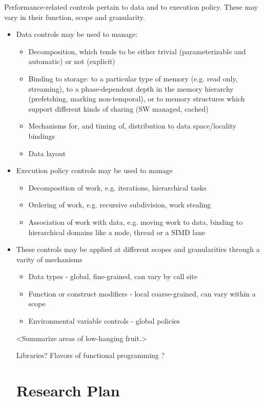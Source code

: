 Performance-related controls pertain to data and to execution policy.  These may vary in their function, scope and granularity.
    \begin{itemize}
    \item Data controls may be used to manage:
      \begin{itemize} 
      \item Decomposition, which tends to be either trivial (parameterizable and automatic) or not (explicit)
      \item Binding to storage: to a particular type of memory (e.g. read only, streaming), to a phase-dependent depth in the memory hierarchy (prefetching, marking non-temporal), or to memory structures which support different kinds of sharing (SW managed, cached)
      \item Mechanisms for, and timing of, distribution to data space/locality bindings
      \item Data layout
      \end{itemize}
    \item Execution policy controls may be used to manage
      \begin{itemize} 
      \item Decomposition of work, e.g. iterations, hierarchical tasks
      \item Ordering of work, e.g. recursive subdivision, work stealing
      \item Association of work with data, e.g. moving work to data, binding to hierarchical domains like a node, thread or a SIMD lane
      \end{itemize}
    \item These controls may be applied at different scopes and granularities through a varity of mechanisms
      \begin{itemize} 
      \item Data types - global, fine-grained, can vary by call site
      \item Function or construct modifiers - local coarse-grained, can vary within a scope
      \item Environmental variable controls - global policies
      \end{itemize}


<Summarize areas of low-hanging fruit.>

Libraries? 
Flavors of functional programming ?

\section{Research Plan}


\end{itemize}
